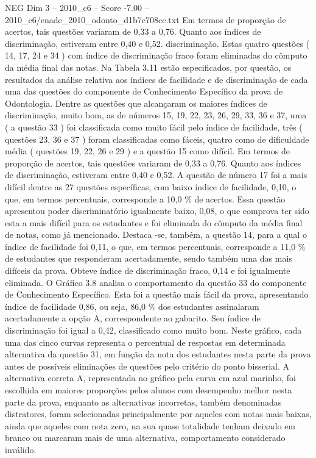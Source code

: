 \begin{textsample}{NEG Dim 3 – 2010\_c6 – Score -7.00 – 2010\_c6/enade\_2010\_odonto\_d1b7c708cc.txt}
Em termos de proporção de acertos, tais questões variaram de 0,33 a 0,76.
Quanto aos índices de discriminação, estiveram entre 0,40 e 0,52. discriminação.
Estas quatro questões ( 14, 17, 24 e 34 ) com índice de discriminação fraco foram eliminadas do cômputo da média final das notas.
Na Tabela 3.11 estão especificados, por questão, os resultados da análise relativa aos índices de facilidade e de discriminação de cada uma das questões do componente de Conhecimento Específico da prova de Odontologia.
Dentre as questões que alcançaram os maiores índices de discriminação, muito bom, as de números 15, 19, 22, 23, 26, 29, 33, 36 e 37, uma ( a questão 33 ) foi classificada como muito fácil pelo índice de facilidade, três ( questões 23, 36 e 37 ) foram classificadas como fáceis, quatro como de dificuldade média ( questões 19, 22, 26 e 29 ) e a questão 15 como difícil.
Em termos de proporção de acertos, tais questões variaram de 0,33 a 0,76.
Quanto aos índices de discriminação, estiveram entre 0,40 e 0,52.
A questão de número 17 foi a mais difícil dentre as 27 questões específicas, com baixo índice de facilidade, 0,10, o que, em termos percentuais, corresponde a 10,0 \% de acertos.
Essa questão apresentou poder discriminatório igualmente baixo, 0,08, o que comprova ter sido esta a mais difícil para os estudantes e foi eliminada do cômputo da média final de notas, como já mencionado.
Destaca -se, também, a questão 14, para a qual o índice de facilidade foi 0,11, o que, em termos percentuais, corresponde a 11,0 \% de estudantes que responderam acertadamente, sendo também uma das mais difíceis da prova.
Obteve índice de discriminação fraco, 0,14 e foi igualmente eliminada.
O Gráfico 3.8 analisa o comportamento da questão 33 do componente de Conhecimento Específico.
Esta foi a questão mais fácil da prova, apresentando índice de facilidade 0,86, ou seja, 86,0 \% dos estudantes assinalaram acertadamente a opção A, correspondente ao gabarito.
Seu índice de discriminação foi igual a 0,42, classificado como muito bom.
Neste gráfico, cada uma das cinco curvas representa o percentual de respostas em determinada alternativa da questão 31, em função da nota dos estudantes nesta parte da prova antes de possíveis eliminações de questões pelo critério do ponto bisserial.
A alternativa correta A, representada no gráfico pela curva em azul marinho, foi escolhida em maiores proporções pelos alunos com desempenho melhor nesta parte da prova, enquanto as alternativas incorretas, também denominadas distratores, foram selecionadas principalmente por aqueles com notas mais baixas, ainda que aqueles com nota zero, na sua quase totalidade tenham deixado em branco ou marcaram mais de uma alternativa, comportamento considerado inválido.

\end{textsample}

